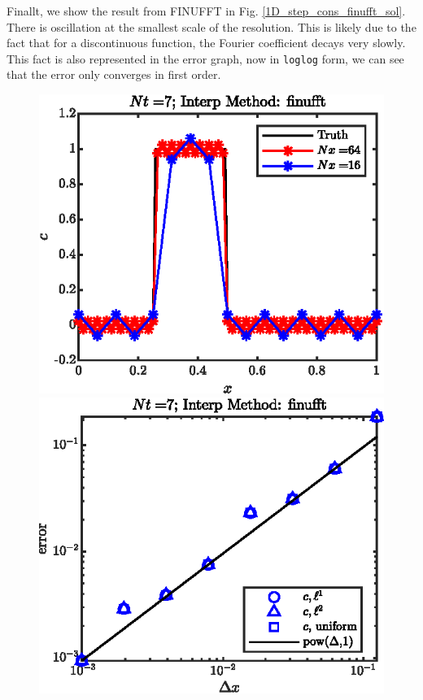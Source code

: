 \documentclass[11pt,letterpaper]{article}
\begin{document}
Finallt, we show the result from FINUFFT in Fig. \ref{1D_step_cons_finufft_sol}. There is oscillation at the smallest scale of the resolution. This is likely due to the fact that for a discontinuous function, the Fourier coefficient decays very slowly. This fact is also represented in the error graph, now in \texttt{loglog} form, we can see that the error only converges in first order. 
\begin{figure}[H]
    \centering
    \includegraphics{figs/1D_step_cons_finufft_sol}
    \includegraphics{figs/1D_step_cons_finufft_convord}
    \caption{}\label{fig:1D_step_cons_finufft_}
\end{figure}
\end{document}
